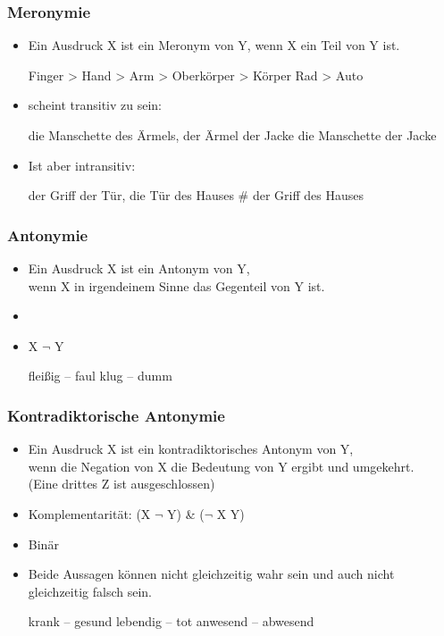 \begin{frame}
\frametitle{Meronymie}

\begin{itemize}
	\item 
Ein Ausdruck X ist ein Meronym von Y, wenn X ein Teil von Y ist.

\vspace{5mm}
	
	\eal
	\ex Finger > Hand > Arm > Oberkörper > Körper
	\ex Rad > Auto
	\zl

	\item scheint transitiv zu sein: 
		
	\ea die Manschette des Ärmels, der Ärmel der Jacke \ras die Manschette der Jacke
	\z
		
	\item Ist aber intransitiv: 
		
	\ea der Griff der Tür, die Tür des Hauses \ras \# der Griff des Hauses
	\z
		
\end{itemize}

\end{frame}



\begin{frame}
\frametitle{Antonymie}

\begin{itemize}
	\item 
Ein Ausdruck X ist ein Antonym von Y,\\
wenn X in irgendeinem Sinne das Gegenteil von Y ist.
	\item[]	
	\item X \ras $\lnot$ Y
	
	\eal 
		\ex fleißig -- faul
		\ex klug -- dumm
	\zl
	
\end{itemize}

\end{frame}



\begin{frame}
\frametitle{Kontradiktorische Antonymie}

\begin{itemize}
	\item 
Ein Ausdruck X ist ein kontradiktorisches Antonym von Y,\\
wenn die Negation von X die Bedeutung von Y ergibt und umgekehrt.\\
(Eine drittes Z ist ausgeschlossen)
	\item Komplementarität: (X \ras $\lnot$ Y) \& ($\lnot$ X  \ras Y)
	\item Binär
	\item Beide Aussagen können nicht gleichzeitig wahr sein und auch nicht gleichzeitig falsch sein.
	
	\eal
		\ex krank -- gesund
		\ex lebendig -- tot
		\ex anwesend -- abwesend
	\zl
	
\end{itemize}

\end{frame}


